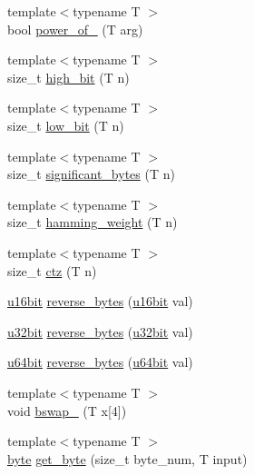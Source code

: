 \begin{DoxyCompactItemize}
\item 
{\footnotesize template$<$typename T $>$ }\\bool \hyperlink{namespaceBotan_a0f9a833e02e7b14462ffa657a2918183}{power\-\_\-of\-\_} (T arg)
\item 
{\footnotesize template$<$typename T $>$ }\\size\-\_\-t \hyperlink{namespaceBotan_ad6c09360d3936ba7077b2d8b14d6cbaa}{high\-\_\-bit} (T n)
\item 
{\footnotesize template$<$typename T $>$ }\\size\-\_\-t \hyperlink{namespaceBotan_aae0c04508a1e70c5d4ecf363e8b75f00}{low\-\_\-bit} (T n)
\item 
{\footnotesize template$<$typename T $>$ }\\size\-\_\-t \hyperlink{namespaceBotan_acec63fb9306fc59d57604c157777361d}{significant\-\_\-bytes} (T n)
\item 
{\footnotesize template$<$typename T $>$ }\\size\-\_\-t \hyperlink{namespaceBotan_abb6896c37db627e3ab8e1fa7c72f79fd}{hamming\-\_\-weight} (T n)
\item 
{\footnotesize template$<$typename T $>$ }\\size\-\_\-t \hyperlink{namespaceBotan_a4045abfe1da803ec251fcfd4d04b0c10}{ctz} (T n)
\item 
\hyperlink{namespaceBotan_ab07face63a00c39ea6ed97f203ee501c}{u16bit} \hyperlink{namespaceBotan_a198d5913615ca737529788ab37e83cdb}{reverse\-\_\-bytes} (\hyperlink{namespaceBotan_ab07face63a00c39ea6ed97f203ee501c}{u16bit} val)
\item 
\hyperlink{namespaceBotan_aacc7d03c95e97e76168fc1c819031830}{u32bit} \hyperlink{namespaceBotan_a341b9bc8a8a8c9b82d0697cec6e96632}{reverse\-\_\-bytes} (\hyperlink{namespaceBotan_aacc7d03c95e97e76168fc1c819031830}{u32bit} val)
\item 
\hyperlink{namespaceBotan_a634063d9fb05e25262ca94ed927030f6}{u64bit} \hyperlink{namespaceBotan_a1526cde639acd2af6db9404938702993}{reverse\-\_\-bytes} (\hyperlink{namespaceBotan_a634063d9fb05e25262ca94ed927030f6}{u64bit} val)
\item 
{\footnotesize template$<$typename T $>$ }\\void \hyperlink{namespaceBotan_a5ec087b9959d7ffcbc195dcedbf10513}{bswap\-\_} (T x\mbox{[}4\mbox{]})
\item 
{\footnotesize template$<$typename T $>$ }\\\hyperlink{namespaceBotan_a7d793989d801281df48c6b19616b8b84}{byte} \hyperlink{namespaceBotan_a3405b032e873f2f5ce765fa4285e310f}{get\-\_\-byte} (size\-\_\-t byte\-\_\-num, T input)

\end{DoxyCompactItemize}
